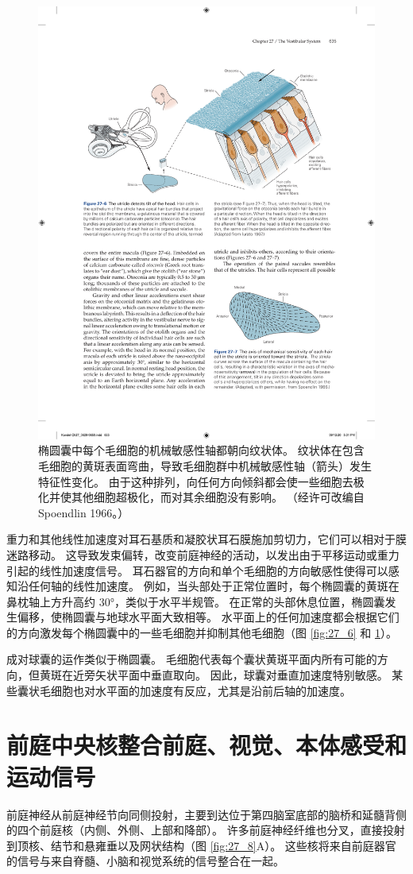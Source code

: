 \begin{figure}[htbp]
	\centering
	\includegraphics[width=0.5\linewidth]{chap27/fig_27_7}
	\caption{椭圆囊中每个毛细胞的机械敏感性轴都朝向纹状体。 纹状体在包含毛细胞的黄斑表面弯曲，导致毛细胞群中机械敏感性轴（箭头）发生特征性变化。 由于这种排列，向任何方向倾斜都会使一些细胞去极化并使其他细胞超极化，而对其余细胞没有影响。 （经许可改编自 Spoendlin 1966。）}
	\label{fig:27_7}
\end{figure}

重力和其他线性加速度对耳石基质和凝胶状耳石膜施加剪切力，它们可以相对于膜迷路移动。 这导致发束偏转，改变前庭神经的活动，以发出由于平移运动或重力引起的线性加速度信号。 耳石器官的方向和单个毛细胞的方向敏感性使得可以感知沿任何轴的线性加速度。 例如，当头部处于正常位置时，每个椭圆囊的黄斑在鼻枕轴上方升高约 30°，类似于水平半规管。 在正常的头部休息位置，椭圆囊发生偏移，使椭圆囊与地球水平面大致相等。 水平面上的任何加速度都会根据它们的方向激发每个椭圆囊中的一些毛细胞并抑制其他毛细胞（图 \ref{fig:27_6} 和 \ref{fig:27_7}）。

成对球囊的运作类似于椭圆囊。 毛细胞代表每个囊状黄斑平面内所有可能的方向，但黄斑在近旁矢状平面中垂直取向。 因此，球囊对垂直加速度特别敏感。 某些囊状毛细胞也对水平面的加速度有反应，尤其是沿前后轴的加速度。


\section{前庭中央核整合前庭、视觉、本体感受和运动信号}
前庭神经从前庭神经节向同侧投射，主要到达位于第四脑室底部的脑桥和延髓背侧的四个前庭核（内侧、外侧、上部和降部）。
许多前庭神经纤维也分叉，直接投射到顶核、结节和悬雍垂以及网状结构（图 \ref{fig:27_8}A）。 
这些核将来自前庭器官的信号与来自脊髓、小脑和视觉系统的信号整合在一起。

